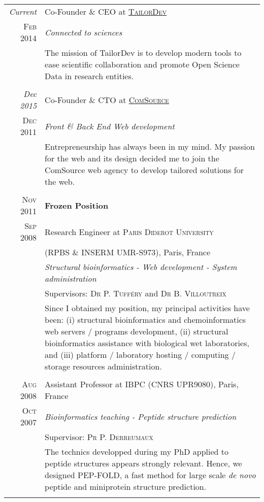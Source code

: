 \documentclass[a4paper,10pt]{article}
\begin{document}
\begin{longtable}{r|p{11cm}}

  \emph{Current} & Co-Founder \& CEO at \textsc{\href{http://tailordev.fr}{TailorDev}} \\
  \textsc{Feb 2014}  & \emph{Connected to sciences}\\
  & \footnotesize{The mission of TailorDev is to develop modern tools to ease
  scientific collaboration and promote Open Science Data in research
  entities.}\\
  \multicolumn{2}{c}{} \\

  \emph{Dec 2015} & Co-Founder \& CTO at \textsc{\href{http://comsource.fr}{ComSource}} \\
  \textsc{Dec 2011}  & \emph{Front \& Back End Web development}\\
  & \footnotesize{Entrepreneurship has always been in my mind. My passion for the web and its design decided me to join the ComSource web agency to develop tailored solutions for the web.}\\
  \multicolumn{2}{c}{} \\

  \textsc{Nov 2011} & \textbf{Frozen Position} \\
  \textsc{Sep 2008} & Research Engineer at \textsc{Paris Diderot University} \\
  & (RPBS \& INSERM UMR-S973), Paris, France \\
  & \emph{Structural bioinformatics - Web development - System administration}\\
  & Supervisors: \textsc{Dr P. Tufféry} and \textsc{Dr B. Villoutreix}\\
  & \footnotesize{Since I obtained my position, my principal activities have been: (i) structural bioinformatics and chemoinformatics web servers / programs development, (ii) structural bioinformatics assistance with biological wet laboratories, and (iii) platform / laboratory hosting / computing / storage resources administration.  }\\
  \multicolumn{2}{c}{} \\

  \textsc{Aug 2008} & Assistant Professor at \textsc{IBPC} (CNRS UPR9080), Paris, France \\
  \textsc{Oct 2007} & \emph{Bioinformatics teaching - Peptide structure prediction}\\
  & Supervisor: \textsc{Pr P. Derreumaux}\\
  & \footnotesize{The technics developped during my PhD applied to peptide structures appears strongly relevant. Hence, we designed PEP-FOLD, a fast method for large scale \textit{de novo} peptide and miniprotein structure prediction.}\\
  \multicolumn{2}{c}{} \\


\end{longtable}
\end{document}
